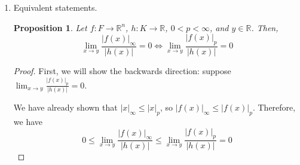 \documentclass[letterpaper,11pt]{article}
\newtheorem{prop}{Proposition}
\newcommand{\R}{\mathbb{R}}
\newcommand{\inv}[1]{\frac{1}{#1}}
\begin{document}
\begin{enumerate}
\begin{proof}
\begin{enumerate}
                \item The maximum component becomes $x_{n+1}$. Clearly,
                    \begin{equation*}
                        x_{n+1} = \left(|x_{n+1}|^p\right)^\inv{p}
                        \leq \left(\sum_{k=1}^{n+1} |x_k|^p\right)^\inv{p}
                    \end{equation*}
                    as required.
            \end{enumerate}

            Next, we will show the second inequality. This involves nothing
            more than a simple algebraic manipulation.
            \begin{equation*}
                \left(\sum_{k=1}^n |x_k|^p\right)^\inv{p}
                \leq
                \left(
                    \sum_{k=1}^n \left(\max_{i=1}^n |x_i|\right)^p
                \right)^\inv{p}
                = \left(n \left(\max_{i=1}^n |x_i|\right)^p\right)^\inv{p}
                = n^\inv{p} \max_{k=1}^n |x_k|
            \end{equation*}
        \end{proof}

    \item Equivalent statements.

        \begin{prop}
            Let $f : F \to \R^n$, $h : K \to \R$, $0 < p < \infty$, and
            $y \in \R$. Then,
            \begin{equation*}
                \lim_{x \to y} \frac{|f(x)|_\infty}{|h(x)|} = 0
                \iff
                \lim_{x \to y} \frac{|f(x)|_p}{|h(x)|} = 0
            \end{equation*}
        \end{prop}

        \begin{proof}
            First, we will show the backwards direction: suppose
            $\lim_{x \to y} \frac{|f(x)|_p}{|h(x)|} = 0$.

            We have already shown that $|x|_\infty \leq |x|_p$, so
            $|f(x)|_\infty \leq |f(x)|_p$. Therefore, we have
            \begin{equation*}
                0
                \leq
                \lim_{x\to y} \frac{|f(x)|_\infty}{|h(x)|}
                \leq
                \lim_{x\to y} \frac{|f(x)|_p}{|h(x)|} = 0
            \end{equation*}


\end{proof}
\end{enumerate}
\end{document}

